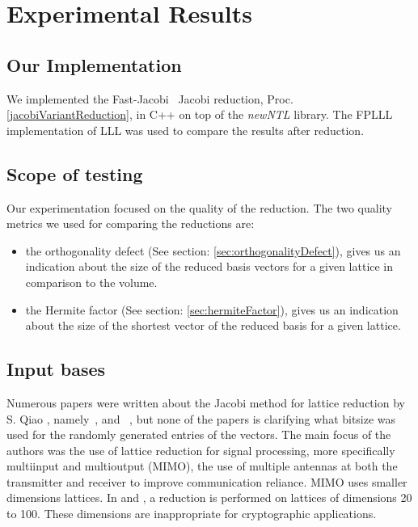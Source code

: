 \documentclass[10pt, a4paper]{article}
\begin{document}


\section{Experimental Results}

\subsection{Our Implementation}

We implemented the Fast-Jacobi~\cite{fastJacobi} Jacobi reduction, Proc.\ref{jacobiVariantReduction}, in C++ on top of the \emph{newNTL} library. The FPLLL implementation of LLL was used to compare the results after reduction.

\subsection{Scope of testing}

Our experimentation focused on the quality of the reduction. The two quality metrics we used for comparing the reductions are:

\begin{itemize}
\item the orthogonality defect (See section: \ref{sec:orthogonalityDefect}), gives us an indication about the size of the reduced basis vectors for a given lattice in comparison to the volume.
\item the Hermite factor (See section: \ref{sec:hermiteFactor}), gives us an indication about the size of the shortest vector of the reduced basis for a given lattice.
\end{itemize}

\subsection{Input bases}
Numerous papers were written about the Jacobi method for lattice reduction by S. Qiao , namely~\cite{originalJacobiMethodLatticeBasisReduction}, \cite{complexityAnalysisOfJacobiMethod} and ~\cite{enhancedJacobi}, but none of the papers is clarifying what bitsize was used for the randomly generated entries of the vectors. The main focus of the authors was the use of lattice reduction for signal processing, more specifically multiinput and multioutput (MIMO), the use of multiple antennas at both the transmitter and receiver to improve communication reliance. MIMO uses smaller dimensions lattices. In \cite{enhancedJacobi} and \cite{tian2014hybrid}, a reduction is performed on lattices of dimensions 20 to 100. These dimensions are inappropriate for cryptographic applications.
\end{document}
